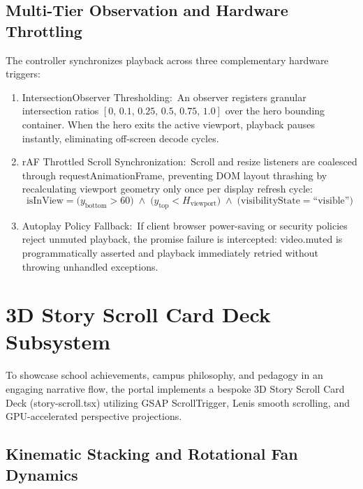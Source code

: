 \documentclass[12pt, a4paper, oneside]{report}
\def\textbf#1{#1}
\def\texttt#1{#1}
\begin{document}
\subsection{Multi-Tier Observation and Hardware Throttling}

The controller synchronizes playback across three complementary hardware triggers:
\begin{enumerate}
  \item \textbf{IntersectionObserver Thresholding:}\ An observer registers granular
        intersection ratios $[0,\, 0.1,\, 0.25,\, 0.5,\, 0.75,\, 1.0]$ over the hero
        bounding container.  When the hero exits the active viewport, playback pauses
        instantly, eliminating off-screen decode cycles.
  \item \textbf{rAF Throttled Scroll Synchronization:}\ Scroll and resize listeners are
        coalesced through \texttt{requestAnimationFrame}, preventing DOM layout thrashing
        by recalculating viewport geometry only once per display refresh cycle:
        \begin{equation}
          \text{isInView} = \bigl(y_{\text{bottom}} > 60\bigr) \;\wedge\;
                            \bigl(y_{\text{top}} < H_{\text{viewport}}\bigr) \;\wedge\;
                            \bigl(\text{visibilityState} = \text{``visible''}\bigr)
        \end{equation}
  \item \textbf{Autoplay Policy Fallback:}\ If client browser power-saving or security
        policies reject unmuted playback, the promise failure is intercepted:
        \texttt{video.muted} is programmatically asserted and playback immediately
        retried without throwing unhandled exceptions.
\end{enumerate}

\section{3D Story Scroll Card Deck Subsystem}

To showcase school achievements, campus philosophy, and pedagogy in an engaging narrative
flow, the portal implements a bespoke \textbf{3D Story Scroll Card Deck}
(\texttt{story-scroll.tsx}) utilizing GSAP ScrollTrigger, Lenis smooth scrolling, and
GPU-accelerated perspective projections.

\subsection{Kinematic Stacking and Rotational Fan Dynamics}
\end{document}
